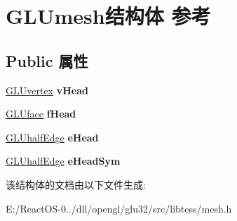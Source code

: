 \hypertarget{struct_g_l_umesh}{}\section{G\+L\+Umesh结构体 参考}
\label{struct_g_l_umesh}
\subsection*{Public 属性}
\begin{DoxyCompactItemize}
\item 
\mbox{\label{struct_g_l_umesh_a0e31778cc57c050aabad2883b8a893c7}} 
\hyperlink{struct_g_l_uvertex}{G\+L\+Uvertex} {\bfseries v\+Head}
\item 
\mbox{\label{struct_g_l_umesh_a96ea40b0b879acbc9b8bd63fadb361d2}} 
\hyperlink{struct_g_l_uface}{G\+L\+Uface} {\bfseries f\+Head}
\item 
\mbox{\label{struct_g_l_umesh_a6b1e6c9397fe2c6a292e7e9ec392f65e}} 
\hyperlink{struct_g_l_uhalf_edge}{G\+L\+Uhalf\+Edge} {\bfseries e\+Head}
\item 
\mbox{\label{struct_g_l_umesh_ab193a82aaf63b1ff61f6cb2987a7e9e4}} 
\hyperlink{struct_g_l_uhalf_edge}{G\+L\+Uhalf\+Edge} {\bfseries e\+Head\+Sym}
\end{DoxyCompactItemize}


该结构体的文档由以下文件生成\+:\begin{DoxyCompactItemize}
\item 
E\+:/\+React\+O\+S-\/0../dll/opengl/glu32/src/libtess/mesh.\+h\end{DoxyCompactItemize}
